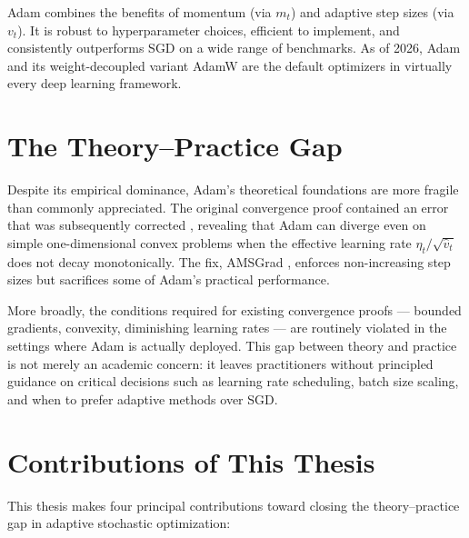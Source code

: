 \documentclass[11pt,twoside,openright]{book}
\begin{document}
Adam combines the benefits of momentum (via $m_t$) and adaptive step sizes (via $v_t$). It is
robust to hyperparameter choices, efficient to implement, and consistently outperforms SGD on a
wide range of benchmarks. As of 2026, Adam and its weight-decoupled variant AdamW
\cite{loshchilov2019} are the default optimizers in virtually every deep learning framework.

\section{The Theory--Practice Gap}

Despite its empirical dominance, Adam's theoretical foundations are more fragile than commonly
appreciated. The original convergence proof \cite{kingma2015} contained an error that was
subsequently corrected \cite{reddi2018}, revealing that Adam can diverge even on simple
one-dimensional convex problems when the effective learning rate $\eta_t/\sqrt{\hat{v}_t}$ does
not decay monotonically. The fix, AMSGrad \cite{reddi2018}, enforces non-increasing step sizes
but sacrifices some of Adam's practical performance.

More broadly, the conditions required for existing convergence proofs — bounded gradients,
convexity, diminishing learning rates — are routinely violated in the settings where Adam is
actually deployed. This gap between theory and practice is not merely an academic concern: it
leaves practitioners without principled guidance on critical decisions such as learning rate
scheduling, batch size scaling, and when to prefer adaptive methods over SGD.

\section{Contributions of This Thesis}

This thesis makes four principal contributions toward closing the theory--practice gap in
adaptive stochastic optimization:
\end{document}

